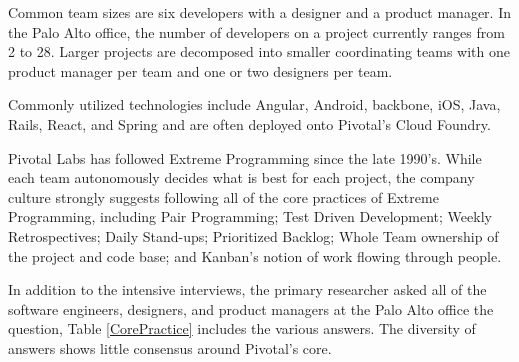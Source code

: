 Common team sizes are six developers with a designer and a product manager. In the Palo Alto office, the number of developers on a project currently ranges from 2 to 28. Larger projects are decomposed into smaller coordinating teams with one product manager per team and one or two designers per team. 

Commonly utilized technologies include Angular, Android, backbone, iOS, Java, Rails, React, and Spring and are often deployed onto Pivotal's Cloud Foundry. 

Pivotal Labs has followed Extreme Programming \cite{ExtremeProgramming2004} since the late 1990's. While each team autonomously decides what is best for each project, the company culture strongly suggests following all of the core practices of Extreme Programming, including Pair Programming; Test Driven Development; Weekly Retrospectives; Daily Stand-ups; Prioritized Backlog; Whole Team ownership of the project and code base; and Kanban's notion of work flowing through people.

In addition to the intensive interviews, the primary researcher asked all of the software engineers, designers, and product managers at the Palo Alto office the question,  Table \ref{CorePractice} includes the various answers. The diversity of answers shows little consensus around Pivotal's core. 


